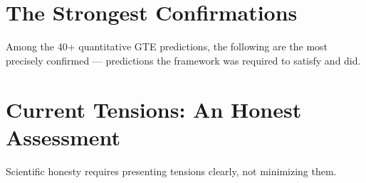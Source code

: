 \documentclass[11pt,a4paper]{article}
\begin{document}
\section{The Strongest Confirmations}
\label{sec:confirmations}

Among the 40+ quantitative GTE predictions, the following are the most
precisely confirmed — predictions the framework was required to satisfy and did.


\section{Current Tensions: An Honest Assessment}
\label{sec:tensions}

Scientific honesty requires presenting tensions clearly, not minimizing them.
\end{document}
